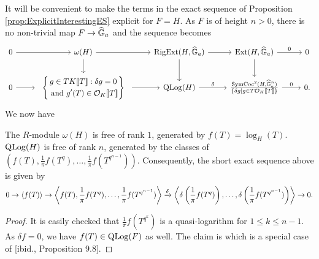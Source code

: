 It will be convenient to make the terms in the exact sequence of Proposition 
\ref{prop:ExplicitInterestingES} explicit for $F = H$. As $F$ is of height $n>0$, 
there is no non-trivial map $F \to \widehat{\mathbb{G}}_a$ and the sequence becomes
\begin{equation*}
\begin{tikzcd}[ampersand replacement=\&]
	0 \& {\omega(H)} \& {\RigExt(H,\GG_a)} \& {\Ext(H,\GG_a)} \& 0 \\
	0 \& \begin{array}{c} \left\{\begin{gathered} {g \in TK\llbr T \rrbr : \delta g = 0} \\          \text{ and $g'(T) \in \cO_K\llbr T \rrbr$}\end{gathered} \right\} \end{array} \& {\QLog(H)} \& {\frac{\SymCoc^2(H, \GG_a^n)}{\{\delta g \mid g \in T \cO_K\llbr T \rrbr\}}} \& 0.
	\arrow[from=1-1, to=1-2]
	\arrow[from=1-2, to=1-3]
	\arrow[from=1-2, to=2-2]
	\arrow[from=1-3, to=1-4]
	\arrow[from=1-3, to=2-3]
	\arrow["0", from=1-4, to=1-5]
	\arrow[from=1-4, to=2-4]
	\arrow["", from=2-1, to=2-2]
	\arrow[from=2-2, to=2-3]
	\arrow["\delta", from=2-3, to=2-4]
	\arrow["0", from=2-4, to=2-5]
\end{tikzcd}   
\end{equation*}
We now have 
\begin{prop}
  The $R$-module $\omega(H)$ is free of rank $1$, generated by 
  $f(T) = \log_H(T)$. $\operatorname {QLog}(H)$ is free of rank $n$, generated by the classes of
  $(f(T), \frac 1\pi f(T^q), \dots, \frac 1\pi f(T^{q^{n-1}}))$. Consequently,
  the short exact sequence above is given by 
  \begin{equation*}
    0 \to \left \langle f(T) \right \rangle \to \left \langle f(T), \frac 1\pi
      f(T^q) , \dots,
    \frac 1\pi f(T^{q^{n-1}}) \right \rangle \xrightarrow{\delta} 
    \left \langle \delta \left(\frac 1\pi f(T^q)\right),\dots, \delta
    \left(\frac 1\pi f(T^{q^{n-1}})\right ) \right \rangle \to 0.
  \end{equation*}
\begin{proof}
  It is easily checked that $\frac 1\pi f(T^{q^k})$ is a quasi-logarithm for 
  $1 \leq k \leq n-1$. As $\delta f = 0$, we have $f(T) \in \operatorname {QLog}(F)$ as well. 
  The claim is \cite[Proposition 13.8]{hopkins1994equivariant} which is a 
  special case of [ibid., Proposition 9.8].
\end{proof}
\end{prop}



